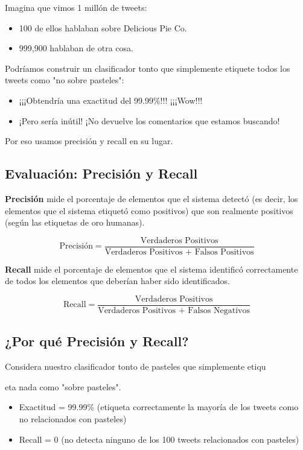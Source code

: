 Imagina que vimos 1 millón de tweets:
\begin{itemize}
\item 100 de ellos hablaban sobre Delicious Pie Co.
\item 999,900 hablaban de otra cosa.
\end{itemize}

Podríamos construir un clasificador tonto que simplemente etiquete todos los tweets como "no sobre pasteles":
\begin{itemize}
\item ¡¡¡Obtendría una exactitud del 99.99\%!!! ¡¡¡Wow!!!
\item ¡Pero sería inútil! ¡No devuelve los comentarios que estamos buscando!
\end{itemize}

Por eso usamos precisión y recall en su lugar.

\subsection{Evaluación: Precisión y Recall}
\textbf{Precisión} mide el porcentaje de elementos que el sistema detectó (es decir, los elementos que el sistema etiquetó como positivos) que son realmente positivos (según las etiquetas de oro humanas).

\[
\text{Precisión} = \frac{\text{Verdaderos Positivos}}{\text{Verdaderos Positivos + Falsos Positivos}}
\]

\textbf{Recall} mide el porcentaje de elementos que el sistema identificó correctamente de todos los elementos que deberían haber sido identificados.

\[
\text{Recall} = \frac{\text{Verdaderos Positivos}}{\text{Verdaderos Positivos + Falsos Negativos}}
\]

\subsection{¿Por qué Precisión y Recall?}
Considera nuestro clasificador tonto de pasteles que simplemente etiqu

eta nada como "sobre pasteles".

\begin{itemize}
  \item Exactitud = 99.99\% (etiqueta correctamente la mayoría de los tweets como no relacionados con pasteles)
  \item Recall = 0 (no detecta ninguno de los 100 tweets relacionados con pasteles)
\end{itemize}

